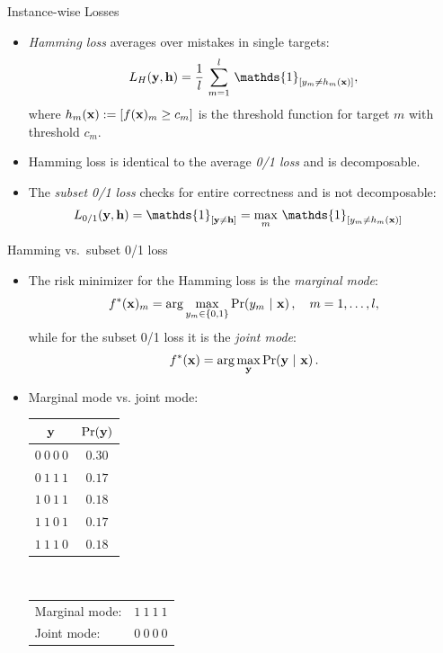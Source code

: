\documentclass[11pt,compress,t,notes=noshow, xcolor=table]{beamer}
\begin{document}
\begin{frame}{Instance-wise Losses}
	\begin{itemize}
		

		\item \emph{Hamming loss} averages over mistakes in single targets:    
		$$
		\displaystyle L_H(\yv, \mathbf{h}) = \frac{1}{l}  \, \sum_{m=1}^l \, \mathds{1}_{[y_m \neq h_m(\xv)]},
		$$
        where $h_m(\mathbf{x}) := [f(\mathbf{x})_m \geq c_m]$ is the threshold function for target $m$ with threshold $c_m$. 
        
        \item Hamming loss is identical to the average \emph{0/1 loss} %
        and is decomposable.

		\item The \emph{subset 0/1 loss} checks for entire correctness and is not decomposable:  
		\begin{align*}
			\displaystyle L_{0/1}(\yv, \mathbf{h}) & = \mathds{1}_{[ \yv \neq \mathbf{h} ]}  = \max_m \, \mathds{1}_{[y_m \neq  h_m(\xv)]}
		\end{align*}
		
	\end{itemize}
\end{frame}


\begin{frame}{Hamming vs.\ subset 0/1 loss}
	\begin{itemize}
		\item The risk minimizer for the Hamming loss is the  \emph{marginal mode}:
		$$
		f^*(\mathbf{x})_m = \arg \max_{y_m \in \{0,1\}} \Pr( y_m  ~|~ \mathbf{x} )\,, \quad m = 1,\ldots,l,
		$$
		while for the subset 0/1 loss it is the \emph{joint mode}:
		$$
		f^*(\mathbf{x}) = \arg \max_{\mathbf{y}} \Pr(\mathbf{y} ~|~ \mathbf{x}) \,.
		$$
		\item Marginal mode vs. joint mode:\\[6pt]
		\begin{center}
			\begin{tabular}{@{}cc@{}}
				\toprule
				$\mathbf{y}$ & $\Pr(\mathbf{y})$ \\
				\hline
				$0~0~0~0$ & $0.30$ \\
				$0~1~1~1$ & $0.17$ \\
				$1~0~1~1$ & $0.18$ \\
				$1~1~0~1$ & $0.17$ \\
				$1~1~1~0$ & $0.18$ \\
				\toprule
			\end{tabular}
			$\qquad$
			\footnotesize{
				\begin{tabular}{lr}
					Marginal mode: & $1~1~1~1$ \\
					Joint mode: & $0~0~0~0$ \\
				\end{tabular}
			}
		\end{center}
	\end{itemize}
\end{frame}
\end{document}
